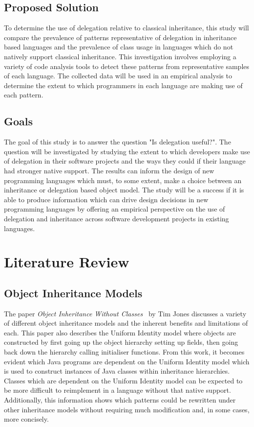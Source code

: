 \documentclass[11pt
              , a4paper
              , twoside
              , openright
              ]{report}
\begin{document}
\section{Proposed Solution}
To determine the use of delegation relative to classical inheritance, this study will compare the prevalence of patterns representative of delegation in inheritance based languages and the prevalence of class usage in languages which do not natively support classical inheritance. This investigation involves employing a variety of code analysis tools to detect these patterns from representative samples of each language. The collected data will be used in an empirical analysis to determine the extent to which programmers in each language are making use of each pattern.

\section{Goals}
The goal of this study is to answer the question "Is delegation useful?". The question will be investigated by studying the extent to which developers make use of delegation in their software projects and the ways they could if their language had stronger native support. The results can inform the design of new programming languages which must, to some extent, make a choice between an inheritance or delegation based object model. The study will be a success if it is able to produce information which can drive design decisions in new programming languages by offering an empirical perspective on the use of delegation and inheritance across software development projects in existing languages. \newpage 
 \newpage \chapter{Literature Review}\label{C:us}
\section{Object Inheritance Models}
The paper \textit{Object Inheritance Without Classes~\cite{InheritanceWithoutClasses}} by Tim Jones discusses a variety of different object inheritance models and the inherent benefits and limitations of each. This paper also describes the Uniform Identity model where objects are constructed by first going up the object hierarchy setting up fields, then going back down the hierarchy calling initialiser functions. From this work, it becomes evident which Java programs are dependent on the Uniform Identity model which is used to construct instances of Java classes within inheritance hierarchies. Classes which are dependent on the Uniform Identity model can be expected to be more difficult to reimplement in a language without that native support. Additionally, this information shows which patterns could be rewritten under other inheritance models without requiring much modification and, in some cases, more concisely.
\newline
\end{document}

